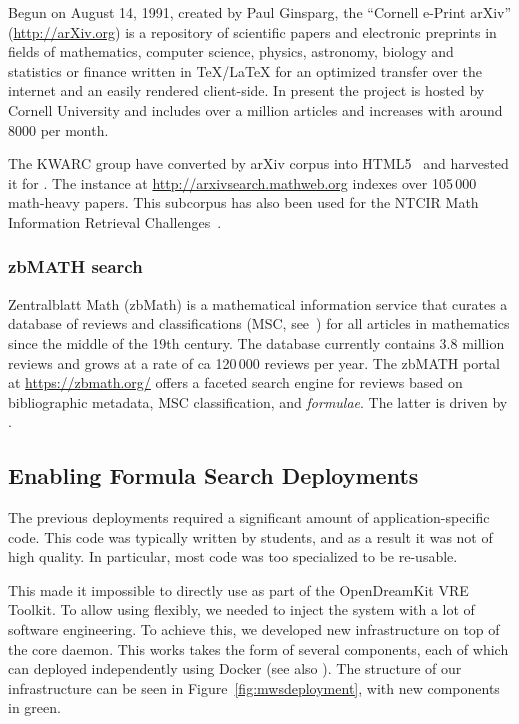 Begun on August 14, 1991, created by Paul Ginsparg, the ``Cornell e-Print arXiv'' (\url{http://arXiv.org}) is a repository of scientific papers and electronic preprints in
fields of mathematics, computer science, physics, astronomy, biology and statistics or finance written in {\TeX/\LaTeX} for an optimized transfer over the internet and an easily rendered client-side.
In present the project is hosted by Cornell University and includes over a million articles and increases with around 8000 per month.

The KWARC group have converted by arXiv corpus into HTML5~\cite{StaKoh:tlcspx10} and harvested it for \MWS. The instance at \url{http://arxivsearch.mathweb.org}
indexes over 105\,000 math-heavy papers.
This subcorpus has also been used for the NTCIR Math Information Retrieval Challenges~\cite{AizKohOun:nmpto13,AizKohOunSch:nmto14,AizKohOunSch:nmto16}.

\subsubsection{zbMATH search}

Zentralblatt Math (zbMath) is a mathematical information service that curates a database of reviews and classifications (MSC, see~\cite{MSC2010}) for all articles in mathematics since the middle of the 19th century. The database currently contains 3.8 million reviews and grows at a rate of ca 120\,000 reviews per year.
The zbMATH portal at \url{https://zbmath.org/} offers a faceted search engine for reviews based on bibliographic metadata, MSC classification, and \emph{formulae}.
The latter is driven by \MWS. 

\subsection{Enabling Formula Search Deployments}\label{sec:software:deployment}

The previous \MWS deployments required a significant amount of application-specific code. 
This code was typically written by students, and as a result it was not of high quality. 
In particular, most code was too specialized to be re-usable. 

This made it impossible to directly use \MWS as part of the OpenDreamKit VRE Toolkit. 
To allow using \MWS flexibly, we needed to inject the system with a lot of software engineering. 
To achieve this, we developed new infrastructure on top of the core \MWS daemon. 
This works takes the form of several components, each of which can deployed independently using Docker (see also ).
The structure of our infrastructure can be seen in Figure~\ref{fig:mwsdeployment}, with new components in green. 

